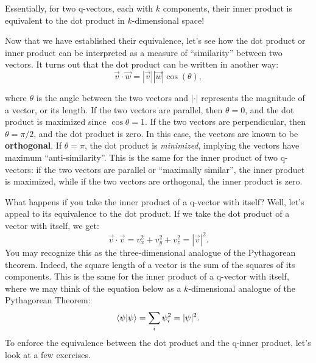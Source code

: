 \documentclass{article}
\begin{document}
    
    \begin{tcolorbox}[arc=2mm]
        Essentially, for two q-vectors, each with $k$ components, their inner product is equivalent to the dot product in $k$-dimensional space!
    \end{tcolorbox}

    \vspace{1em}

    Now that we have established their equivalence, let's see how the dot product or inner product can be interpreted as a measure of ``similarity'' between two vectors. It turns out that the dot product can be written in another way:
    \[
    \vec{v} \cdot \vec{w} = |\vec{v}||\vec{w}|\cos(\theta),
    \]

    where $\theta$ is the angle between the two vectors and $|\cdot |$ represents the magnitude of a vector, or its length. If the two vectors are parallel, then $\theta = 0$, and the dot product is maximized since $\cos\theta = 1$. If the two vectors are perpendicular, then $\theta = \pi / 2$, and the dot product is zero. In this case, the vectors are known to be \textbf{orthogonal}. If $\theta=\pi$, the dot product is \textit{minimized}, implying the vectors have maximum ``anti-similarity''. This is the same for the inner product of two q-vectors: if the two vectors are parallel or ``maximally similar'', the inner product is maximized, while if the two vectors are orthogonal, the inner product is zero.

    \vspace{1em}

    What happens if you take the inner product of a q-vector with itself? Well, let's appeal to its equivalence to the dot product. If we take the dot product of a vector with itself, we get:
    \[
    \vec{v} \cdot \vec{v} = v_x^2+v_y^2+v_z^2 = |\vec{v}|^2.
    \]
    You may recognize this as the three-dimensional analogue of the Pythagorean theorem. Indeed, the square length of a vector is the sum of the squares of its components. This is the same for the inner product of a q-vector with itself, where we may think of the equation below as a $k$-dimensional analogue of the Pythagorean Theorem:
    \[
    \braket{\psi}{\psi} = \sum_i \psi_i^2 = |\psi|^2.
    \]
    To enforce the equivalence between the dot product and the q-inner product, let's look at a few exercises.
\end{document}
